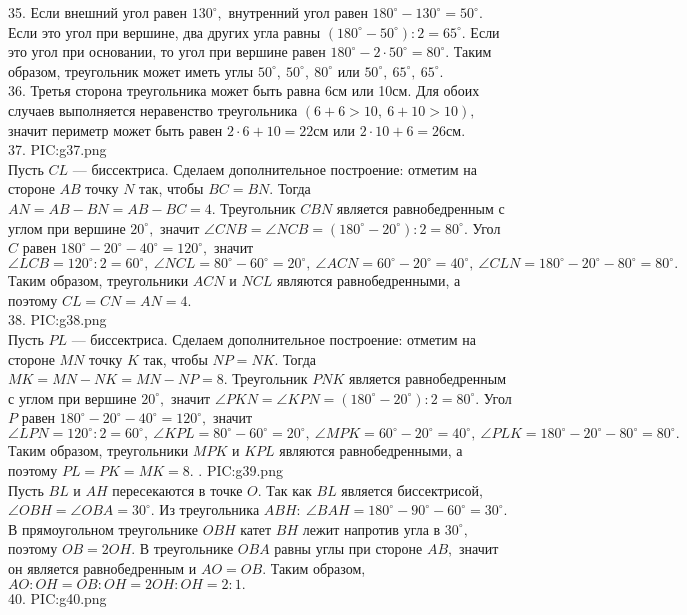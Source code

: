 35. Если внешний угол равен $130^\circ,$ внутренний угол равен $180^\circ-130^\circ=50^\circ.$ Если это угол при вершине, два других угла равны $(180^\circ-50^\circ):2=65^\circ.$ Если это угол при основании, то угол при вершине равен $180^\circ-2\cdot50^\circ=80^\circ.$ Таким образом, треугольник может иметь углы  $50^\circ,\ 50^\circ,\ 80^\circ$ или $50^\circ,\ 65^\circ,\ 65^\circ.$\\
36. Третья сторона треугольника может быть равна 6см или 10см. Для обоих случаев выполняется неравенство треугольника $(6+6>10,\ 6+10>10),$ значит периметр может быть равен $2\cdot6+10=22$см или $2\cdot10+6=26$см.\\
37. {{PIC:g37.png}}\\
Пусть $CL$ --- биссектриса. Сделаем дополнительное построение: отметим на стороне $AB$ точку $N$ так, чтобы $BC=BN.$ Тогда $AN=AB-BN=AB-BC=4.$ Треугольник $CBN$ является равнобедренным с углом при вершине $20^\circ,$ значит $\angle CNB=\angle NCB=(180^\circ-20^\circ):2=80^\circ.$ Угол $C$ равен $180^\circ-20^\circ-40^\circ=120^\circ,$ значит $\angle LCB=120^\circ:2=60^\circ,\ \angle NCL=80^\circ-60^\circ=20^\circ,\ \angle ACN=60^\circ-20^\circ=40^\circ,\ \angle CLN=180^\circ-20^\circ-80^\circ=80^\circ.$ Таким образом, треугольники $ACN$ и $NCL$ являются равнобедренными, а поэтому $CL=CN=AN=4.$\\
38. {{PIC:g38.png}}\\
Пусть $PL$ --- биссектриса. Сделаем дополнительное построение: отметим на стороне $MN$ точку $K$ так, чтобы $NP=NK.$ Тогда $MK=MN-NK=MN-NP=8.$ Треугольник $PNK$ является равнобедренным с углом при вершине $20^\circ,$ значит $\angle PKN=\angle KPN=(180^\circ-20^\circ):2=80^\circ.$ Угол $P$ равен $180^\circ-20^\circ-40^\circ=120^\circ,$ значит $\angle LPN=120^\circ:2=60^\circ,\ \angle KPL=80^\circ-60^\circ=20^\circ,\ \angle MPK=60^\circ-20^\circ=40^\circ,\ \angle PLK=180^\circ-20^\circ-80^\circ=80^\circ.$ Таким образом, треугольники $MPK$ и $KPL$ являются равнобедренными, а поэтому $PL=PK=MK=8.$\newpage
{}. {{PIC:g39.png}}\\
Пусть $BL$ и $AH$ пересекаются в точке $O.$ Так как $BL$ является биссектрисой, $\angle OBH=\angle OBA=30^\circ.$ Из треугольника $ABH:\ \angle BAH=180^\circ-90^\circ-60^\circ=30^\circ.$ В прямоугольном треугольнике $OBH$ катет $BH$ лежит напротив угла в $30^\circ,$ поэтому $OB=2OH.$ В треугольнике $OBA$ равны углы при стороне $AB,$ значит он является равнобедренным и $AO=OB.$ Таким образом, $AO:OH=OB:OH=2OH:OH=2:1.$\\
40. {{PIC:g40.png}}\\
